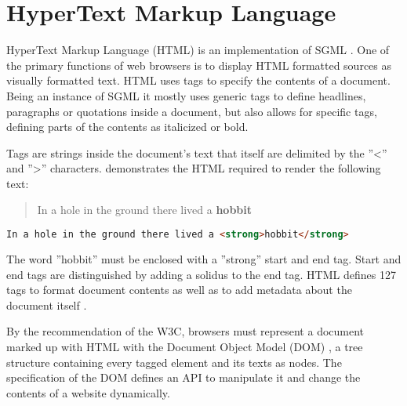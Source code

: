 






\section{HyperText Markup Language}

\label{sec:html_sgml_def}

HyperText Markup Language (HTML) is an implementation of SGML \cite[SGML and HTML]{HTML401}. One of the primary functions of web browsers is to display HTML formatted sources as visually formatted text. HTML uses tags to specify the contents of a document. Being an instance of SGML it mostly uses generic tags to define headlines, paragraphs or quotations inside a document, but also allows for specific tags, defining parts of the contents as italicized or bold.

Tags are strings inside the document's text that itself are delimited by the ''<'' and ''>'' characters.  demonstrates the HTML required to render the following text:

\begin{quotation}
In a hole in the ground there lived a \textbf{hobbit}
\end{quotation}

\begin{lstlisting}[language=html, caption=Text formatted as bold with the ''strong'' tag, label=lst:html_markup_bold_example]
In a hole in the ground there lived a <strong>hobbit</strong>
\end{lstlisting}

The word ''hobbit'' must be enclosed with a ''strong'' start and end tag. Start and end tags are distinguished by adding a solidus to the end tag. HTML defines 127 tags to format document contents as well as to add metadata about the document itself \cite{mozel}.

By the recommendation of the W3C, browsers must represent a document marked up with HTML with the Document Object Model (DOM) \cite{DOM1}, a tree structure containing every tagged element and its texts as nodes. The specification of the DOM defines an API to manipulate it and change the contents of a website dynamically.

